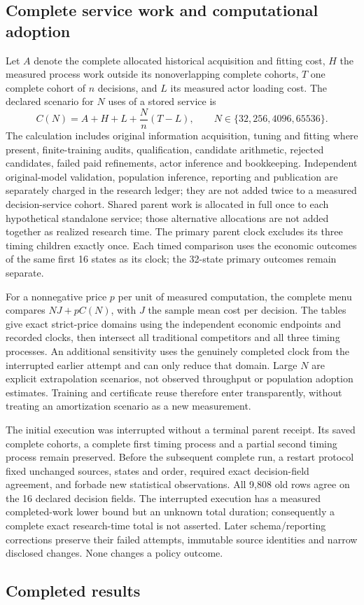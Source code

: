 \subsection{Complete service work and computational adoption}
Let $A$ denote the complete allocated historical acquisition and fitting cost,
$H$ the measured process work outside its nonoverlapping complete cohorts,
$T$ one complete cohort of $n$ decisions, and $L$ its measured actor loading cost.
The declared scenario for $N$ uses of a stored service is
\begin{equation}\label{eq:fullcost122}
 C(N)=A+H+L+\frac{N}{n}(T-L),
 \qquad N\in\{32,256,4096,65536\}.
\end{equation}
The calculation includes original information acquisition, tuning and fitting
where present, finite-training audits, qualification, candidate arithmetic,
rejected candidates, failed paid refinements, actor inference and bookkeeping.
Independent original-model validation, population inference, reporting and
publication are separately charged in the research ledger; they are not added
twice to a measured decision-service cohort. Shared parent work is allocated
in full once to each hypothetical standalone
service; those alternative allocations are not added together as realized
research time. The primary parent clock excludes its three timing children
exactly once. Each timed comparison uses the economic outcomes of the same
first 16 states as its clock; the 32-state primary outcomes remain separate.

For a nonnegative price $p$ per unit of measured computation, the complete menu
compares $N J+pC(N)$, with $J$ the sample mean cost per decision. The tables give exact strict-price domains using the
independent economic endpoints and recorded clocks, then intersect all
traditional competitors and all three timing processes. An additional
sensitivity uses the genuinely completed clock from the interrupted earlier
attempt and can only reduce that domain. Large $N$ are explicit extrapolation
scenarios, not observed throughput or population adoption estimates. Training
and certificate reuse therefore enter transparently, without treating an
amortization scenario as a new measurement.

The initial execution was interrupted without a terminal parent receipt.
Its saved complete cohorts, a complete first timing process and a partial
second timing process remain preserved. Before the subsequent complete run,
a restart protocol fixed unchanged sources, states and order, required exact
decision-field agreement, and forbade new statistical observations. All 9,808
old rows agree on the 16 declared decision fields. The interrupted execution
has a measured completed-work lower bound but an unknown total duration;
consequently a complete exact research-time total is not asserted. Later
schema/reporting corrections preserve their failed attempts, immutable source
identities and narrow disclosed changes. None changes a policy outcome.

\subsection{Completed results}

